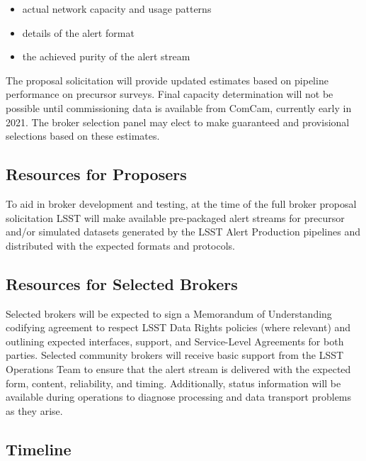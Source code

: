 \begin{itemize}
	\item actual network capacity and usage patterns
	\item details of the alert format
	\item the achieved purity of the alert stream
\end{itemize}

The proposal solicitation will provide updated estimates based on pipeline performance on precursor surveys.
Final capacity determination will not be possible until commissioning data is available from ComCam, currently early in 2021.
The broker selection panel may elect to make guaranteed and provisional selections based on these estimates.

\subsection{Resources for Proposers}

To aid in broker development and testing, at the time of the full broker proposal solicitation LSST will make available pre-packaged alert streams for precursor and/or simulated datasets generated by the LSST Alert Production pipelines and distributed with the expected formats and protocols.

\subsection{Resources for Selected Brokers}

Selected brokers will be expected to sign a Memorandum of Understanding codifying agreement to respect LSST Data Rights policies (where relevant) and outlining expected interfaces, support, and Service-Level Agreements for both parties.
Selected community brokers will receive basic support from the LSST Operations Team to ensure that the alert stream is delivered with the expected form, content, reliability, and timing.
Additionally, status information will be available during operations to diagnose processing and data transport problems as they arise.

\subsection{Timeline}


